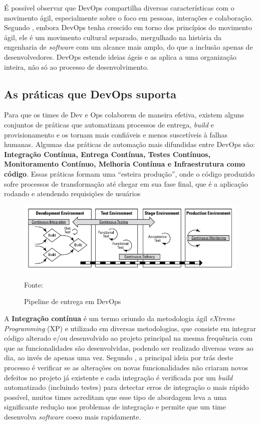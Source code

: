 \documentclass[twoside,english,brazilian]{UNISINOSartigo}
\newcommand{\source}[1]{\caption*{Fonte: {#1}} }
\begin{document}
É possível observar que DevOps compartilha diversas características com o movimento ágil, especialmente sobre o foco em pessoas, interações e colaboração. Segundo , embora DevOps tenha crescido em torno dos princípios do movimento ágil, ele é um movimento cultural separado, mergulhado na história da engenharia de \textit{software} com um alcance mais amplo, do que a inclusão apenas de desenvolvedores. DevOps estende ideias ágeis e as aplica a uma organização inteira, não só ao processo de desenvolvimento.  

\subsection{As práticas que DevOps suporta}
Para que os times de Dev e Ops colaborem de maneira efetiva, existem alguns conjuntos de práticas que automatizam processos de entrega, \textit{build} e provisionamento e os tornam mais confiáveis e menos suscetíveis à falhas humanas. Algumas das práticas de automação mais difundidas entre DevOps são: \textbf{Integração Contínua, Entrega Contínua, Testes Contínuos, Monitoramento Contínuo, Melhoria Contínua
e Infraestrutura como código}. Essas práticas formam uma ``esteira produção'', onde o código produzido sofre processos de transformação até chegar em sua fase final, que é a aplicação rodando e atendendo requisições de usuários

\begin{figure}[h]
    \centering
    \caption{Pipeline de entrega em DevOps}
    \includegraphics[scale=.7]{imagens/pipeline.jpg}
    \source{}
    \label{fig:pipeline}
\end{figure}




A \textbf{Integração contínua} é um termo oriundo da metodologia ágil  \textit{eXtreme Programming} (XP) e utilizado em diversas metodologias, que consiste em integrar código alterado e/ou desenvolvido ao projeto principal na mesma frequência com que as funcionalidades são desenvolvidas, podendo ser realizado diversas vezes ao dia, ao invés de apenas uma vez. Segundo , a principal ideia  por trás deste processo é verificar se as alterações ou novas funcionalidades não criaram novos defeitos no projeto já existente e cada integração é verificada por um \textit{build} automatizado (incluindo testes) para detectar erros de integração o mais rápido possível, muitos times acreditam que esse tipo de abordagem leva a uma significante redução nos problemas de integração e permite que um time desenvolva \textit{software} coeso mais rapidamente.
\end{document}
